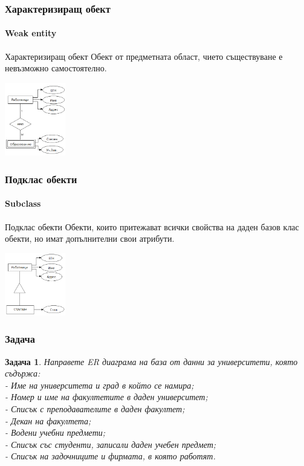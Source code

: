 \documentclass{beamer}
\newtheorem{prob}{Задача}
\begin{document}
  \begin{frame}
    \frametitle{Характеризиращ обект}
    \framesubtitle{Weak entity}
    \begin{block}{Характеризиращ обект}
       Обект от предметната област, чието съществуване е невъзможно самостоятелно.
    \end{block}
    \includegraphics[width=100px]{img/weak_entity}
  \end{frame}

  \begin{frame}
    \frametitle{Подклас обекти}
    \framesubtitle{Subclass}
    \begin{block}{Подклас обекти}
      Обекти, които притежават всички свойства на даден базов клас обекти, но имат допълнителни свои атрибути.
    \end{block}
    \includegraphics[width=100px]{img/subclass}
  \end{frame}

  \begin{frame}
    \frametitle{Задача}
      \begin{prob}
        Направете ER диаграма на база от данни за университети, която съдържа:\\
        - Име на университета и град в който се намира;\\
        - Номер и име на факултетите в даден университет;\\
        - Списък с преподавателите в даден факултет;\\
        - Декан на факултета;\\
        - Водени учебни предмети;\\
        - Списък със студенти, записали даден учебен предмет;\\
        - Списък на задочниците и фирмата, в която работят.
      \end{prob}
  \end{frame}
\end{document}

